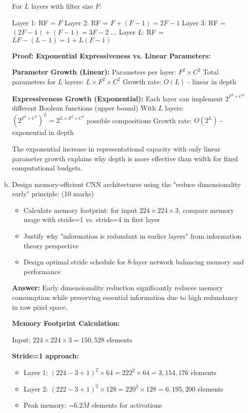 \documentclass[12pt]{article}
\newcommand{\answer}[1]{{\color{answercolor}\textbf{Answer:} #1}}
\newcommand{\explanation}[1]{{\color{explanationcolor}#1}}
\begin{document}
\begin{enumerate}[(a)]
{    For $L$ layers with filter size $F$:
    
    Layer 1: RF = $F$
    Layer 2: RF = $F + (F-1) = 2F - 1$
    Layer 3: RF = $(2F-1) + (F-1) = 3F - 2$
    ...
    Layer $L$: RF = $LF - (L-1) = 1 + L(F-1)$
    
    \textbf{Proof: Exponential Expressiveness vs. Linear Parameters:}
    
    \textbf{Parameter Growth (Linear):}
    Parameters per layer: $F^2 \times C^2$
    Total parameters for $L$ layers: $L \times F^2 \times C^2$
    Growth rate: $O(L)$ - linear in depth
    
    \textbf{Expressiveness Growth (Exponential):}
    Each layer can implement $2^{F^2 \times C^2}$ different Boolean functions (upper bound)
    With $L$ layers: $(2^{F^2 \times C^2})^L = 2^{L \times F^2 \times C^2}$ possible compositions
    Growth rate: $O(2^L)$ - exponential in depth
    
    The exponential increase in representational capacity with only linear parameter growth explains why depth is more effective than width for fixed computational budgets.
    }
    
    \item Design memory-efficient CNN architectures using the "reduce dimensionality early" principle: \hfill (10 marks)
    \begin{itemize}
        \item Calculate memory footprint: for input $224 \times 224 \times 3$, compare memory usage with stride=1 vs. stride=4 in first layer
        \item Justify why "information is redundant in earlier layers" from information theory perspective
        \item Design optimal stride schedule for 8-layer network balancing memory and performance
    \end{itemize}
    
    \answer{Early dimensionality reduction significantly reduces memory consumption while preserving essential information due to high redundancy in raw pixel space.}
    
    \explanation{
    \textbf{Memory Footprint Calculation:}
    
    Input: $224 \times 224 \times 3 = 150,528$ elements
    
    \textbf{Stride=1 approach:}
    \begin{itemize}
        \item Layer 1: $(224-3+1)^2 \times 64 = 222^2 \times 64 = 3,154,176$ elements
        \item Layer 2: $(222-3+1)^2 \times 128 = 220^2 \times 128 = 6,195,200$ elements
        \item Peak memory: $\sim 6.2M$ elements for activations
    \end{itemize}
    
}
\end{enumerate}
\end{document}
